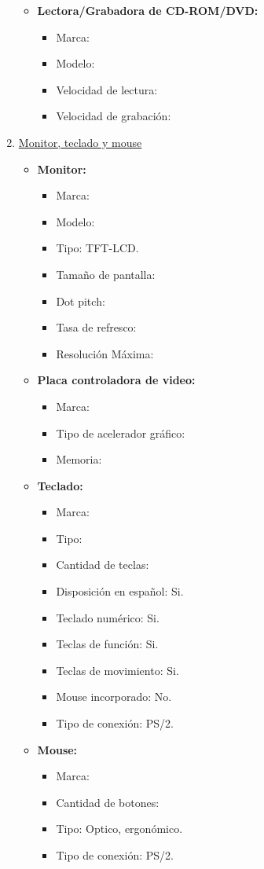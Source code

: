 \begin{enumerate}
\begin{itemize}
    \item \textbf{Lectora/Grabadora de CD-ROM/DVD:}
    \begin{itemize}
      \item Marca:
      \item Modelo:
      \item Velocidad de lectura:
      \item Velocidad de grabación:
    \end{itemize}
  \end{itemize}
  
  \item \underline{Monitor, teclado y mouse}
  \begin{itemize}
    \item \textbf{Monitor:}
    \begin{itemize}
      \item Marca:
      \item Modelo:
      \item Tipo: TFT-LCD.
      \item Tamaño de pantalla:
      \item Dot pitch:
      \item Tasa de refresco:
      \item Resolución Máxima:
    \end{itemize}
    
    \item \textbf{Placa controladora de video:}
    \begin{itemize}
      \item Marca:
      \item Tipo de acelerador gráfico:
      \item Memoria:
    \end{itemize}
    
    \item \textbf{Teclado:}
    \begin{itemize}
      \item Marca:
      \item Tipo:
      \item Cantidad de teclas:
      \item Disposición en español: Si.
      \item Teclado numérico: Si.
      \item Teclas de función: Si.
      \item Teclas de movimiento: Si.
      \item Mouse incorporado: No.
      \item Tipo de conexión: PS/2.
    \end{itemize}
    
    \item \textbf{Mouse:}
    \begin{itemize}
      \item Marca:
      \item Cantidad de botones:
      \item Tipo: Optico, ergonómico.
      \item Tipo de conexión: PS/2.
    \end{itemize}
  \end{itemize}
\end{enumerate} 
